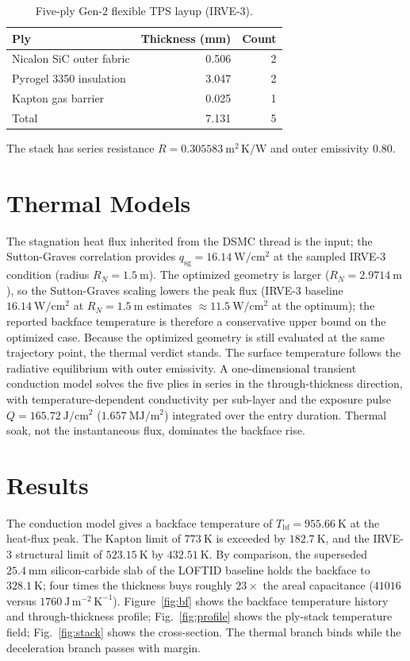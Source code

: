 \documentclass[10pt]{article}
\begin{document}
\begin{table}[htbp]
\centering
\caption{Five-ply Gen-2 flexible TPS layup (IRVE-3).}
\label{tab:stack}
\begin{tabular}{lrr}
\toprule
Ply & Thickness (mm) & Count \\
\midrule
Nicalon SiC outer fabric & 0.506 & 2 \\
Pyrogel 3350 insulation & 3.047 & 2 \\
Kapton gas barrier & 0.025 & 1 \\
\midrule
Total & 7.131 & 5 \\
\bottomrule
\end{tabular}
\end{table}
The stack has series resistance $R=0.305583~\mathrm{m^2\,K/W}$ and outer emissivity $0.80$.

\section{Thermal Models}
The stagnation heat flux inherited from the DSMC thread is the input; the Sutton-Graves correlation provides $q_{\mathrm{sg}}=16.14~\mathrm{W/cm^2}$ at the sampled IRVE-3 condition (radius $R_N=1.5~\mathrm{m}$). The optimized geometry is larger ($R_N=2.9714~\mathrm{m}$), so the Sutton-Graves scaling lowers the peak flux (IRVE-3 baseline $16.14~\mathrm{W/cm^2}$ at $R_N=1.5~\mathrm{m}$ estimates $\approx 11.5~\mathrm{W/cm^2}$ at the optimum); the reported backface temperature is therefore a conservative upper bound on the optimized case. Because the optimized geometry is still evaluated at the same trajectory point, the thermal verdict stands. The surface temperature follows the radiative equilibrium with outer emissivity. A one-dimensional transient conduction model solves the five plies in series in the through-thickness direction, with temperature-dependent conductivity per sub-layer and the exposure pulse $Q=165.72~\mathrm{J/cm^2}$ ($1.657~\mathrm{MJ/m^2}$) integrated over the entry duration. Thermal soak, not the instantaneous flux, dominates the backface rise.

\section{Results}
The conduction model gives a backface temperature of $T_{\mathrm{bf}}=955.66~\mathrm{K}$ at the heat-flux peak. The Kapton limit of $773~\mathrm{K}$ is exceeded by $182.7~\mathrm{K}$, and the IRVE-3 structural limit of $523.15~\mathrm{K}$ by $432.51~\mathrm{K}$. By comparison, the superseded $25.4~\mathrm{mm}$ silicon-carbide slab of the LOFTID baseline holds the backface to $328.1~\mathrm{K}$; four times the thickness buys roughly $23\times$ the areal capacitance ($41016$ versus $1760~\mathrm{J\,m^{-2}\,K^{-1}}$). Figure~\ref{fig:bf} shows the backface temperature history and through-thickness profile; Fig.~\ref{fig:profile} shows the ply-stack temperature field; Fig.~\ref{fig:stack} shows the cross-section. The thermal branch binds while the deceleration branch passes with margin.
\end{document}
